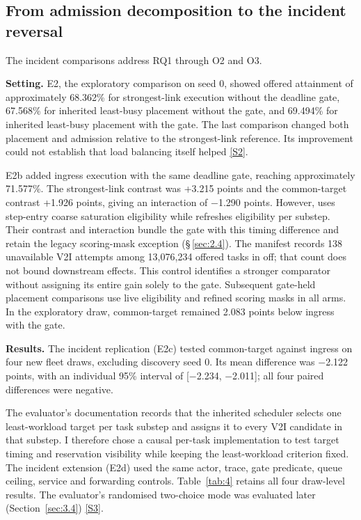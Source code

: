 \documentclass[12pt,a4paper]{article}
\begin{document}

\FloatBarrier
\subsection{From admission decomposition to the incident reversal}\label{sec:3.2}

The incident comparisons address RQ1 through O2 and O3.

\textbf{Setting.} E2, the exploratory comparison on seed 0, showed offered attainment of approximately 68.362\% for strongest-link execution without the deadline gate, 67.568\% for inherited least-busy placement without the gate, and 69.494\% for inherited least-busy placement with the gate. The last comparison changed both placement and admission relative to the strongest-link reference. Its improvement could not establish that load balancing itself helped \hyperref[source-s2]{[S2]}.

E2b added ingress execution with the same deadline gate, reaching approximately 71.577\%. The strongest-link contrast was +3.215 points and the common-target contrast +1.926 points, giving an interaction of \ensuremath{-}1.290 points. However,  uses step-entry coarse saturation eligibility while  refreshes eligibility per substep. Their contrast and interaction bundle the gate with this timing difference and retain the legacy scoring-mask exception (\S\,\ref{sec:2.4}). The manifest records 138 unavailable V2I attempts among 13,076,234 offered tasks in off; that count does not bound downstream effects. This control identifies a stronger comparator without assigning its entire gain solely to the gate. Subsequent gate-held placement comparisons use live eligibility and refined scoring masks in all arms. In the exploratory draw, common-target remained 2.083 points below ingress with the gate.

\textbf{Results.} The incident replication (E2c) tested common-target against ingress on four new fleet draws, excluding discovery seed 0. Its mean difference was \ensuremath{-}2.122 points, with an individual 95\% interval of [\ensuremath{-}2.234, \ensuremath{-}2.011]; all four paired differences were negative.

The evaluator's documentation records that the inherited scheduler selects one least-workload target per task substep and assigns it to every V2I candidate in that substep. I therefore chose a causal per-task implementation to test target timing and reservation visibility while keeping the least-workload criterion fixed. The incident extension (E2d) used the same actor, trace, gate predicate, queue ceiling, service and forwarding controls. Table~\ref{tab:4} retains all four draw-level results. The evaluator's randomised two-choice mode was evaluated later (Section~\ref{sec:3.4}) \hyperref[source-s3]{[S3]}.
\end{document}
